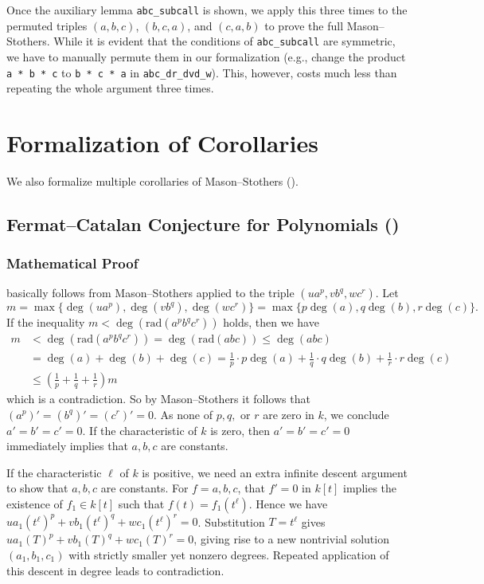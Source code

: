 \documentclass[runningheads]{llncs}
\newcommand{\rad}{\mathrm{rad}}
\begin{document}
Once the auxiliary lemma \texttt{abc\_subcall} is shown, we apply this three times to the permuted triples $(a, b, c)$, $(b, c, a)$, and $(c, a, b)$ to prove the full Mason--Stothers.
While it is evident that the conditions of \texttt{abc\_subcall} are symmetric,
we have to manually permute them in our formalization (e.g., change the product \texttt{a * b * c} to \texttt{b * c * a} in \texttt{abc\_dr\_dvd\_w}).
This, however, costs much less than repeating the whole argument three times.


\section{Formalization of Corollaries}
\label{sec:formal-corr}

We also formalize multiple corollaries of Mason--Stothers ().

\subsection{Fermat--Catalan Conjecture for Polynomials ()}
\label{subsec:pf-fermat-catalan}


\subsubsection{Mathematical Proof}
\label{subsubsec:pf-fermat-catalan}

 basically follows from Mason--Stothers applied to the triple $(ua^p, vb^q, wc^r)$.
Let 
$$m = \max \{\deg (ua^p), \deg(vb^q), \deg(wc^r)\} = \max \{ p\deg (a), q \deg (b), r \deg (c)\}.$$
If the inequality $m < \deg (\rad(a^pb^qc^r))$ holds, then we have
\begin{align*}
     m &<\deg (\rad(a^pb^qc^r)) = \deg(\rad(abc)) \leq \deg(abc) \\
     &= \deg(a) + \deg (b) + \deg(c) = \frac{1}{p} \cdot p\deg(a) + \frac{1}{q} \cdot q\deg(b) + \frac{1}{r} \cdot r\deg(c) \\
     &\leq \left(\frac{1}{p} + \frac{1}{q} + \frac{1}{r} \right)m
\end{align*}
which is a contradiction. So by Mason--Stothers it follows that $(a^p)' = (b^q)' = (c^r)' = 0$. As none of $p, q,$ or $r$ are zero in $k$, we conclude $a' = b' = c' = 0$. If the characteristic of $k$ is zero, then $a' = b' = c' = 0$ immediately implies that $a, b, c$ are constants.

If the characteristic $\ell$ of $k$ is positive, we need an extra infinite descent argument to show that $a, b, c$ are constants.
For $f = a, b, c$, that $f' = 0$ in $k[t]$ implies the existence of $f_1 \in k[t]$ such that $f(t) = f_1(t^\ell)$.
Hence we have $ua_1(t^\ell)^p + v b_1(t^\ell)^q + w c_1(t^\ell)^r = 0$.
Substitution $T = t^\ell$ gives $ua_1(T)^p + vb_1(T)^q + w c_1(T)^r = 0$, giving rise to a new nontrivial solution $(a_1, b_1, c_1)$ with strictly smaller yet nonzero degrees.
Repeated application of this descent in degree leads to contradiction.
\end{document}
